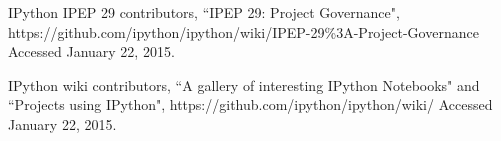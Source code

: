 \documentclass[conference]{IEEEtran}
\begin{document}
\begin{thebibliography}{1}
IPython IPEP 29 contributors, ``IPEP 29: Project Governance", https://github.com/ipython/ipython/wiki/IPEP-29\%3A-Project-Governance Accessed January 22, 2015.

IPython wiki contributors, ``A gallery of interesting IPython Notebooks" and ``Projects using IPython", https://github.com/ipython/ipython/wiki/ Accessed January 22, 2015.

%
%


\end{thebibliography}





\end{document}
